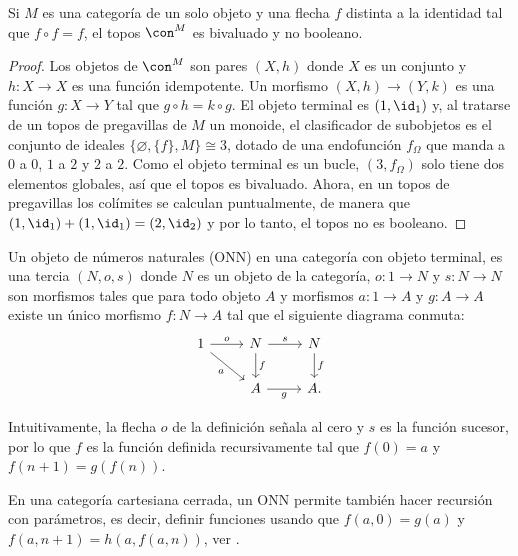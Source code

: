 \begin{proposition}
  Si $M$ es una categoría de un solo objeto y una flecha $f$ distinta a la identidad tal que 
  $f\circ f = f$, el topos $\con^M$ es bivaluado y no booleano.
\end{proposition}
\begin{proof}
  Los objetos de $\con^M$ son pares $(X,h)$ donde $X$ es un conjunto y $h\colon X\to X$ es 
  una función idempotente. Un morfismo $(X,h)\to (Y,k)$ es una función $g\colon X\to Y$ tal que 
  $g\circ h = k \circ g$. El objeto terminal es $(1,\id_1)$ y, al tratarse de un topos de pregavillas de $M$ un monoide, el 
  clasificador de subobjetos es el conjunto de ideales $\{\varnothing,\{f\},M\}\cong 3$, dotado de una endofunción $f_{\Omega}$ que manda a $0$ a $0$, $1$ a $2$ y $2$ a $2$. 
  Como el objeto terminal es un bucle, $(3,f_{\Omega})$ solo tiene dos elementos globales, así que el topos es bivaluado. 
  Ahora, en un topos de pregavillas los colímites se calculan puntualmente, de manera que $(1,\id_1)+(1,\id_1)=(2,\id_2)$ y
  por lo tanto, el topos no es booleano.
\end{proof}

\begin{definition}
  Un objeto de números naturales (ONN) en una categoría con objeto terminal, es una tercia $(N,o,s)$
  donde $N$ es un objeto de la categoría, $o\colon 1\to N$ y $s\colon N\to N$ son morfismos tales que para todo
  objeto $A$ y morfismos $a\colon 1\to A$ y $g\colon A\to A$ existe un único morfismo $f\colon N\to A$ tal que
  el siguiente diagrama conmuta:
  \begin{equation*}
    \begin{tikzcd}
      1\ar{r}{o}\ar[swap]{rd}{a} & N\ar{d}{f}\ar{r}{s} & N\ar{d}{f} \\
      & A\ar[swap]{r}{g} & A.
    \end{tikzcd}
  \end{equation*}
\end{definition}

Intuitivamente, la flecha $o$ de la definición señala al cero y $s$ es la función sucesor, por lo que
$f$ es la función definida recursivamente tal que $f(0)=a$ y $f(n+1)=g(f(n))$.

En una categoría cartesiana cerrada, un ONN permite también hacer recursión con parámetros,
es decir, definir funciones usando que $f(a,0)=g(a)$ y $f(a,n+1)=h(a,f(a,n))$, ver \cite{johnstone2002sketches}.

